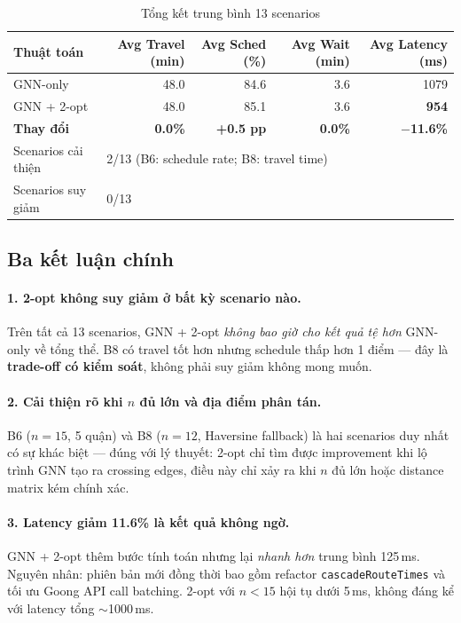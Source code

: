 \documentclass[12pt,a4paper]{article}
\begin{document}
\begin{table}[H]
\centering
\begin{tabular}{lrrrr}
\toprule
\textbf{Thuật toán} & \textbf{Avg Travel (min)} & \textbf{Avg Sched (\%)} & \textbf{Avg Wait (min)} & \textbf{Avg Latency (ms)} \\
\midrule
GNN-only            & 48.0  & 84.6  & 3.6   & 1079 \\
GNN + 2-opt         & 48.0  & 85.1  & 3.6   & \textbf{954} \\
\midrule
\textbf{Thay đổi}   & \textbf{0.0\%} & \textbf{+0.5 pp} & \textbf{0.0\%} & \textbf{$-$11.6\%} \\
Scenarios cải thiện & \multicolumn{4}{l}{2/13 (B6: schedule rate; B8: travel time)} \\
Scenarios suy giảm  & \multicolumn{4}{l}{0/13} \\
\bottomrule
\end{tabular}
\caption{Tổng kết trung bình 13 scenarios}
\label{tab:summary}
\end{table}

\subsection{Ba kết luận chính}

\paragraph{1. 2-opt không suy giảm ở bất kỳ scenario nào.}
Trên tất cả 13 scenarios, GNN + 2-opt \textit{không bao giờ cho kết quả tệ hơn} GNN-only
về tổng thể. B8 có travel tốt hơn nhưng schedule thấp hơn 1 điểm --- đây là
\textbf{trade-off có kiểm soát}, không phải suy giảm không mong muốn.

\paragraph{2. Cải thiện rõ khi $n$ đủ lớn và địa điểm phân tán.}
B6 ($n=15$, 5 quận) và B8 ($n=12$, Haversine fallback) là hai scenarios duy nhất có sự
khác biệt --- đúng với lý thuyết: 2-opt chỉ tìm được improvement khi lộ trình GNN tạo ra
crossing edges, điều này chỉ xảy ra khi $n$ đủ lớn hoặc distance matrix kém chính xác.

\paragraph{3. Latency giảm 11.6\% là kết quả không ngờ.}
GNN + 2-opt thêm bước tính toán nhưng lại \textit{nhanh hơn} trung bình 125\,ms.
Nguyên nhân: phiên bản mới đồng thời bao gồm refactor
\texttt{cascadeRouteTimes} và tối ưu Goong API call batching. 2-opt với $n<15$ hội tụ
dưới 5\,ms, không đáng kể với latency tổng $\sim$1000\,ms.
\end{document}
